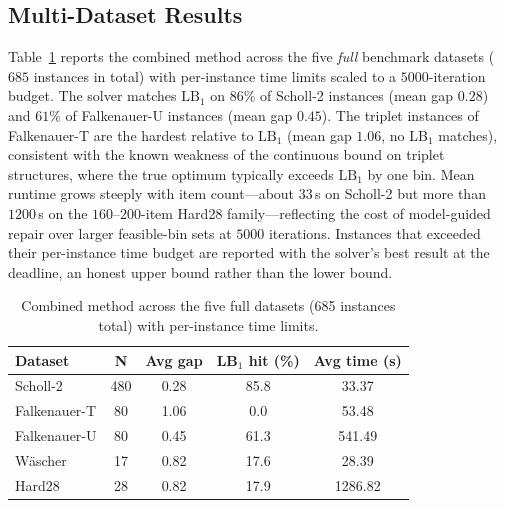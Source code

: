 \documentclass[conference]{IEEEtran}
\begin{document}
\subsection{Multi-Dataset Results}
Table~\ref{tab:multi} reports the combined method across the five \emph{full}
benchmark datasets ($685$ instances in total) with per-instance time limits scaled
to a $5000$-iteration budget. The solver matches $\mathrm{LB}_1$ on $86\%$ of
Scholl-2 instances (mean gap $0.28$) and $61\%$ of Falkenauer-U instances (mean
gap $0.45$). The triplet instances of Falkenauer-T are the hardest relative to
$\mathrm{LB}_1$ (mean gap $1.06$, no LB$_1$ matches), consistent with the known
weakness of the continuous bound on triplet structures, where the true optimum
typically exceeds $\mathrm{LB}_1$ by one bin. Mean runtime grows steeply with
item count---about $33$\,s on Scholl-2 but more than $1200$\,s on the
$160$--$200$-item Hard28 family---reflecting the cost of model-guided repair over
larger feasible-bin sets at $5000$ iterations. Instances that exceeded their
per-instance time budget are reported with the solver's best result at the
deadline, an honest upper bound rather than the lower bound.

\begin{table}[htbp]
	\caption{Combined method across the five full datasets (685 instances total) with per-instance time limits.}
	\label{tab:multi}
	\centering
	\begin{tabular}{l c c c c}
		\hline
		\textbf{Dataset}  & \textbf{N} & \textbf{Avg gap} & \textbf{LB$_1$ hit (\%)} & \textbf{Avg time (s)} \\
		\hline
		Scholl-2          & 480        & 0.28             & 85.8              & 33.37                 \\
		Falkenauer-T      & 80         & 1.06             & 0.0               & 53.48                 \\
		Falkenauer-U      & 80         & 0.45             & 61.3              & 541.49                \\
		W\"ascher         & 17         & 0.82             & 17.6              & 28.39                 \\
		Hard28            & 28         & 0.82             & 17.9              & 1286.82               \\
		\hline
	\end{tabular}
\end{table}
\end{document}

